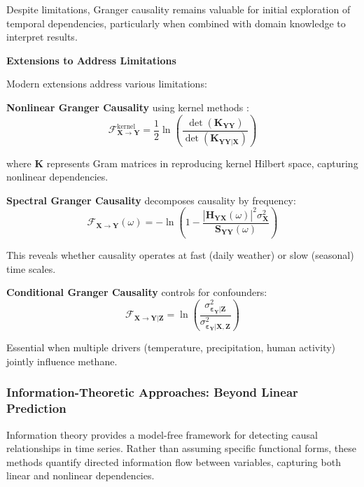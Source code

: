 Despite limitations, Granger causality remains valuable for initial exploration of temporal dependencies, particularly when combined with domain knowledge to interpret results.

\textbf{Extensions to Address Limitations}

Modern extensions address various limitations:

\textbf{Nonlinear Granger Causality} using kernel methods \cite{Marinazzo2008}:
\begin{equation}
	\mathcal{F}_{\mathbf{X} \rightarrow \mathbf{Y}}^{\text{kernel}} = \frac{1}{2}\ln\left(\frac{\det(\mathbf{K}_{\mathbf{Y}\mathbf{Y}})}{\det(\mathbf{K}_{\mathbf{Y}\mathbf{Y}|\mathbf{X}})}\right)
\end{equation}

where $\mathbf{K}$ represents Gram matrices in reproducing kernel Hilbert space, capturing nonlinear dependencies.

\textbf{Spectral Granger Causality} decomposes causality by frequency:
\begin{equation}
	\mathcal{F}_{\mathbf{X} \rightarrow \mathbf{Y}}(\omega) = -\ln\left(1 - \frac{|\mathbf{H}_{\mathbf{Y}\mathbf{X}}(\omega)|^2 \sigma_{\mathbf{X}}^2}{\mathbf{S}_{\mathbf{Y}\mathbf{Y}}(\omega)}\right)
\end{equation}

This reveals whether causality operates at fast (daily weather) or slow (seasonal) time scales.

\textbf{Conditional Granger Causality} controls for confounders:
\begin{equation}
	\mathcal{F}_{\mathbf{X} \rightarrow \mathbf{Y}|\mathbf{Z}} = \ln\left(\frac{\sigma^2_{\boldsymbol{\varepsilon}_{\mathbf{Y}} | \mathbf{Z}}}{\sigma^2_{\boldsymbol{\varepsilon}_{\mathbf{Y}} | \mathbf{X},\mathbf{Z}}}\right)
\end{equation}

Essential when multiple drivers (temperature, precipitation, human activity) jointly influence methane.

\subsubsection{Information-Theoretic Approaches: Beyond Linear Prediction}

Information theory provides a model-free framework for detecting causal relationships in time series. Rather than assuming specific functional forms, these methods quantify directed information flow between variables, capturing both linear and nonlinear dependencies.

